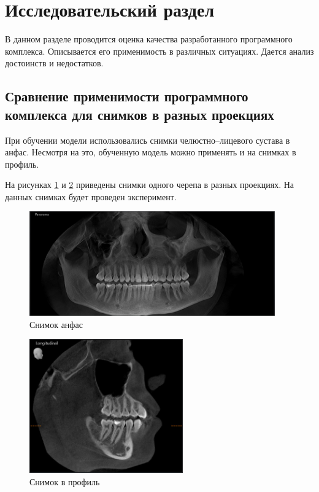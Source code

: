 \section{Исследовательский раздел}

В данном разделе проводится оценка качества разработанного программного комплекса. Описывается его применимость в различных ситуациях. Дается анализ достоинств и недостатков.

\subsection{Сравнение применимости программного комплекса для снимков в разных проекциях}

При обучении модели использовались снимки челюстно--лицевого сустава в анфас. Несмотря на это, обученную модель можно применять и на снимках в профиль.

На рисунках \ref{fig:anfas} и \ref{fig:profile} приведены снимки одного черепа в разных проекциях. На данных снимках будет проведен эксперимент.

\begin{figure}[H]
	\centering
	\includegraphics[width=400px]{img/anfas.jpeg}
	\caption{Снимок анфас}
	\label{fig:anfas}
\end{figure}

\begin{figure}[H]
	\centering
	\includegraphics[width=250px]{img/profile.jpeg}
	\caption{Снимок в профиль}
	\label{fig:profile}
\end{figure}

